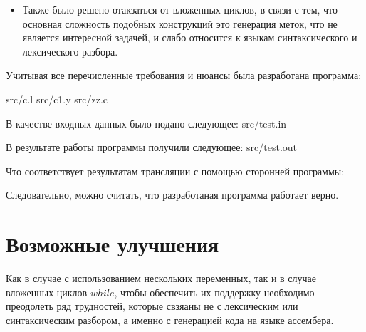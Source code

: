 \begin{itemize}
        \item   Также было решено отакзаться от вложенных циклов, в связи с тем, что
                основная сложность подобных конструкций это генерация меток, что
                не является интересной задачей, и слабо относится к языкам синтаксического и
                лексического разбора.

    \end{itemize} 

    Учитывая все перечисленные требования и нюансы была разработана программа:

     {src/c.l}
     {src/c1.y}
     {src/zz.c}

    В качестве входных данных было подано следующее:
     {src/test.in}

    В результате работы программы получили следующее:
     {src/test.out}

    Что соответствует результатам трансляции с помощью сторонней программы:
    \begin{figure}[h]
        \label{fig:image}
    \end{figure}

    Следовательно, можно считать, что разработаная программа работает верно.

\section{Возможные улучшения}
    Как в случае с использованием нескольких переменных,
    так и в случае вложенных циклов $while$,
    чтобы обеспечить их поддержку необходимо  преодолеть ряд трудностей,
    которые свзяаны не с лексическим или синтаксическим разбором, а именно
    с генерацией кода на языке ассембера.
    
